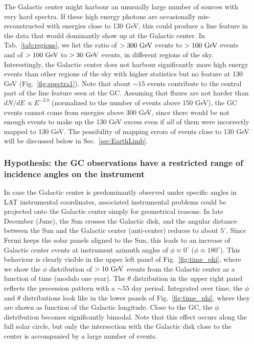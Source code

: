 \documentclass[aps,twocolumn,prd,superscriptaddress,showpacs,nofootinbib,fixfloat]{revtex4}
\newcommand{\GeV}{{\rm ~GeV}}
\begin{document}
The Galactic center might harbour an unusually large number
of sources with very hard spectra. If these high energy
photons are occasionally mis-reconstructed with energies
close to 130 GeV, this could produce a line feature in the
data that would dominantly show up at the Galactic center.
In Tab.~\ref{tab:regions}, we list the ratio of $>300\GeV$
events to $>100\GeV$ events and of $>100\GeV$ to $>30\GeV$
events, in different regions of the sky.  Interestingly, the
Galactic center does not harbour significantly more high
energy events than other regions of the sky with higher
statistics but no feature at 130 GeV
(Fig.~\ref{fig:spectra1}). Note that
about $\sim15$ events contribute to the central part of the
line feature seen at the GC. Assuming that fluxes are not
harder than $dN/dE \propto E^{-2.0}$ (normalized to the
number of events above 150 GeV), the GC events cannot come
from energies above 300 GeV, since there would be not enough
events to make up the 130 GeV excess even if \emph{all} of
them were incorrectly mapped to 130 GeV. The possibility of
mapping errors of events close to 130 GeV will be discussed
below in Sec.~\ref{sec:EarthLimb}.

\subsubsection{Hypothesis: the GC observations have a
restricted range of incidence angles on the instrument}

In case the Galactic center is predominantly observed under
specific angles in LAT instrumental coordinates, associated
instrumental problems could be projected onto the Galactic
center simply for geometrical reasons. 
In late December (June), the Sun crosses the Galactic disk,
and the angular
distance between the Sun and the Galactic center
(anti-center) reduces to about $5^\circ$. Since Fermi keeps
the solar panels aligned to the Sun, this leads to an
increase of Galactic center events at instrument azimuth
angles of $\phi\approx 0^\circ$ ($\phi\approx 180^\circ$).
This behaviour is clearly visible in the upper left panel of
Fig.~\ref{fig:time_phi}, where we show the $\phi$
distribution of $>10\GeV$ events from the Galactic center as
a function of time (modulo one year).  The $\theta$
distribution in the upper right panel reflects the
precession pattern with a $\sim55$ day period. Integrated
over time, the $\phi$ and $\theta$ distributions look like
in the lower panels of Fig.~\ref{fig:time_phi}, where they
are shown as function of the Galactic longitude. Close to
the GC, the $\phi$ distribution becomes significantly
bimodal. Note that this effect occurs along the full solar
circle, but only the intersection with the Galactic disk
close to the center is accompanied by a large number of
events.
\end{document}
